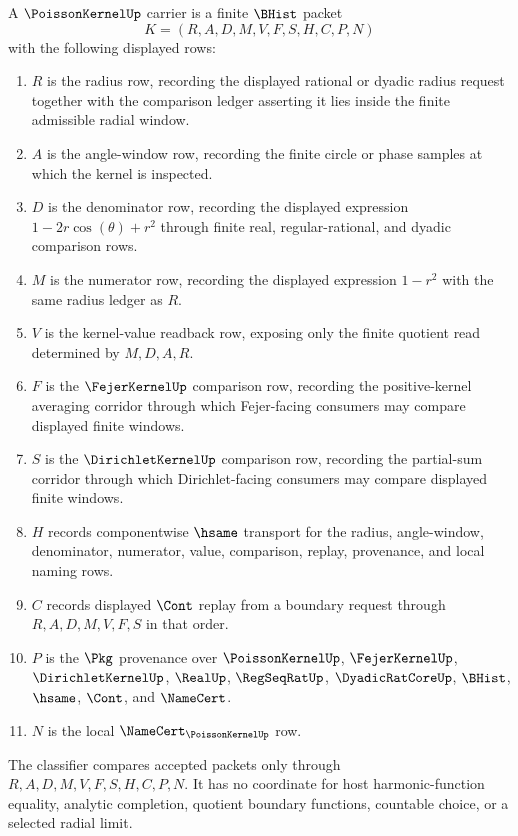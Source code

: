 \begin{definition}\label{def:poisson-kernel-carrier}
A $\PoissonKernelUp$ carrier is a finite $\BHist$ packet
$$
K=(R,A,D,M,V,F,S,H,C,P,N)
$$
with the following displayed rows:
\begin{enumerate}
\item $R$ is the radius row, recording the displayed rational or dyadic radius request together with the comparison ledger asserting it lies inside the finite admissible radial window.
\item $A$ is the angle-window row, recording the finite circle or phase samples at which the kernel is inspected.
\item $D$ is the denominator row, recording the displayed expression $1-2r\cos(\theta)+r^{2}$ through finite real, regular-rational, and dyadic comparison rows.
\item $M$ is the numerator row, recording the displayed expression $1-r^{2}$ with the same radius ledger as $R$.
\item $V$ is the kernel-value readback row, exposing only the finite quotient read determined by $M,D,A,R$.
\item $F$ is the $\FejerKernelUp$ comparison row, recording the positive-kernel averaging corridor through which Fejer-facing consumers may compare displayed finite windows.
\item $S$ is the $\DirichletKernelUp$ comparison row, recording the partial-sum corridor through which Dirichlet-facing consumers may compare displayed finite windows.
\item $H$ records componentwise $\hsame$ transport for the radius, angle-window, denominator, numerator, value, comparison, replay, provenance, and local naming rows.
\item $C$ records displayed $\Cont$ replay from a boundary request through $R,A,D,M,V,F,S$ in that order.
\item $P$ is the $\Pkg$ provenance over $\PoissonKernelUp$, $\FejerKernelUp$, $\DirichletKernelUp$, $\RealUp$, $\RegSeqRatUp$, $\DyadicRatCoreUp$, $\BHist$, $\hsame$, $\Cont$, and $\NameCert$.
\item $N$ is the local $\NameCert_{\PoissonKernelUp}$ row.
\end{enumerate}
The classifier compares accepted packets only through $R,A,D,M,V,F,S,H,C,P,N$. It has no coordinate for host harmonic-function equality, analytic completion, quotient boundary functions, countable choice, or a selected radial limit.
\end{definition}

